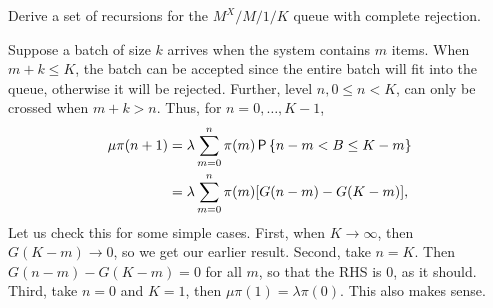 \begin{exercise}\label{ex:l-156}
 Derive a set of recursions for the $M^X/M/1/K$ queue with complete rejection.
\begin{solution}
  Suppose a batch of size $k$ arrives when the system contains $m$ items.
  When $m+k \leq K$, the batch can be accepted since the entire batch will fit into the queue, otherwise it will be rejected.
  Further, level $n, 0\leq n < K$, can only be crossed when $m+k > n$.
  Thus, for $n=0,\ldots, K-1$,
 \begin{align*}
 \mu \pi(n+1) &= \lambda \sum_{m=0}^n \pi(m) \P{n-m < B \leq K-m} \\
&=\lambda \sum_{m=0}^n \pi(m) [G(n-m)-G(K-m)],
 \end{align*}
 Let us check this for some simple cases.
 First, when $K\to \infty$, then $G(K-m)\to 0$, so we get our earlier result.
 Second, take $n=K$.
 Then $G(n-m)-G(K-m)=0$ for all $m$, so that the RHS is 0, as it should.
 Third, take $n=0$ and $K=1$, then $\mu \pi(1)= \lambda \pi(0)$.
 This also makes sense.
\end{solution}
\end{exercise}





